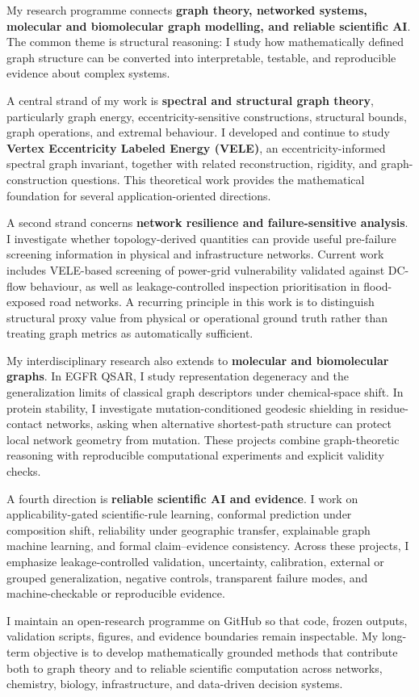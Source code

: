 
\begingroup
\setlength{\parindent}{0pt}
\setlength{\parskip}{6pt}
\sloppy

My research programme connects \textbf{graph theory, networked systems, molecular and biomolecular graph modelling, and reliable scientific AI}. The common theme is structural reasoning: I study how mathematically defined graph structure can be converted into interpretable, testable, and reproducible evidence about complex systems.

A central strand of my work is \textbf{spectral and structural graph theory}, particularly graph energy, eccentricity-sensitive constructions, structural bounds, graph operations, and extremal behaviour. I developed and continue to study \textbf{Vertex Eccentricity Labeled Energy (VELE)}, an eccentricity-informed spectral graph invariant, together with related reconstruction, rigidity, and graph-construction questions. This theoretical work provides the mathematical foundation for several application-oriented directions.

A second strand concerns \textbf{network resilience and failure-sensitive analysis}. I investigate whether topology-derived quantities can provide useful pre-failure screening information in physical and infrastructure networks. Current work includes VELE-based screening of power-grid vulnerability validated against DC-flow behaviour, as well as leakage-controlled inspection prioritisation in flood-exposed road networks. A recurring principle in this work is to distinguish structural proxy value from physical or operational ground truth rather than treating graph metrics as automatically sufficient.

My interdisciplinary research also extends to \textbf{molecular and biomolecular graphs}. In EGFR QSAR, I study representation degeneracy and the generalization limits of classical graph descriptors under chemical-space shift. In protein stability, I investigate mutation-conditioned geodesic shielding in residue-contact networks, asking when alternative shortest-path structure can protect local network geometry from mutation. These projects combine graph-theoretic reasoning with reproducible computational experiments and explicit validity checks.

A fourth direction is \textbf{reliable scientific AI and evidence}. I work on applicability-gated scientific-rule learning, conformal prediction under composition shift, reliability under geographic transfer, explainable graph machine learning, and formal claim--evidence consistency. Across these projects, I emphasize leakage-controlled validation, uncertainty, calibration, external or grouped generalization, negative controls, transparent failure modes, and machine-checkable or reproducible evidence.

I maintain an open-research programme on GitHub so that code, frozen outputs, validation scripts, figures, and evidence boundaries remain inspectable. My long-term objective is to develop mathematically grounded methods that contribute both to graph theory and to reliable scientific computation across networks, chemistry, biology, infrastructure, and data-driven decision systems.

\endgroup
